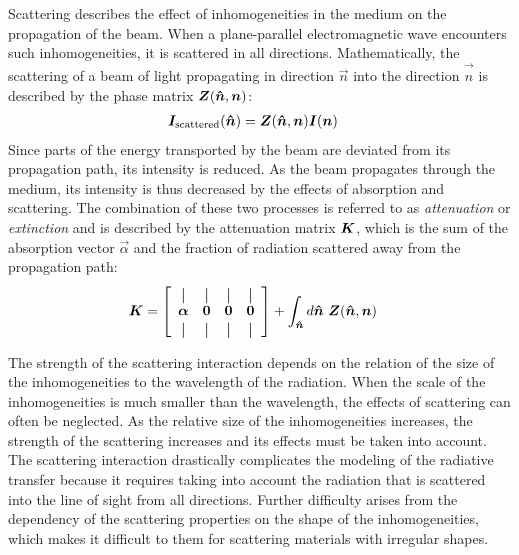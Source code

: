 Scattering describes the effect of inhomogeneities in the medium on the
propagation of the beam. When a plane-parallel electromagnetic wave encounters
such inhomogeneities, it is scattered in all directions. Mathematically, the
scattering of a beam of light propagating in direction $\vec{n}$ into the
direction $\vec{\hat{n}}$ is described by the phase matrix
$\bm{Z}(\bm{\hat{n}}, \bm{n})$:
\begin{align}
  \bm{I}_\text{scattered}(\bm{\hat{n}}) &= \bm{Z}(\bm{\hat{n}}, \bm{n}) \bm{I}(\bm{n})
\end{align}
Since parts of the energy transported by the beam are deviated from its
propagation path, its intensity is reduced. As the beam propagates through the
medium, its intensity is thus decreased by the effects of absorption
and scattering. The combination of these two processes is referred to
as \textit{attenuation} or \textit{extinction} and is described by the
attenuation matrix $\bm{K}$, which is the sum of the absorption vector
$\vec{\alpha}$ and the fraction of radiation scattered away from the propagation
path:
\newcommand*{\vertbar}{\rule[-1ex]{0.5pt}{2.5ex}}
\newcommand*{\horzbar}{\rule[.5ex]{2.5ex}{0.5pt}}
\begin{align}
  \vec{K} &=
  \left [ \begin{array}{cccc}
      \vertbar & \vertbar & \vertbar & \vertbar \\
      \vec{\alpha} & \vec{0} & \vec{0} & \vec{0} \\
      \vertbar & \vertbar & \vertbar & \vertbar
    \end{array} \right ]
       + \int_{\vec{\hat{n}}} d\vec{\hat{n}}\ \mat{Z}(\vec{\hat{n}}, \vec{n})
\end{align}

The strength of the scattering interaction depends on the relation of the size
of the inhomogeneities to the wavelength of the radiation. When the scale of the
inhomogeneities is much smaller than the wavelength, the effects of scattering
can often be neglected. As the relative size of the inhomogeneities increases,
the strength of the scattering increases and its effects must be taken into
account. The scattering interaction drastically complicates the modeling of the
radiative transfer because it requires taking into account the radiation that is
scattered into the line of sight from all directions. Further difficulty arises
from the dependency of the scattering properties on the shape of the
inhomogeneities, which makes it difficult to them for scattering
materials with irregular shapes.

